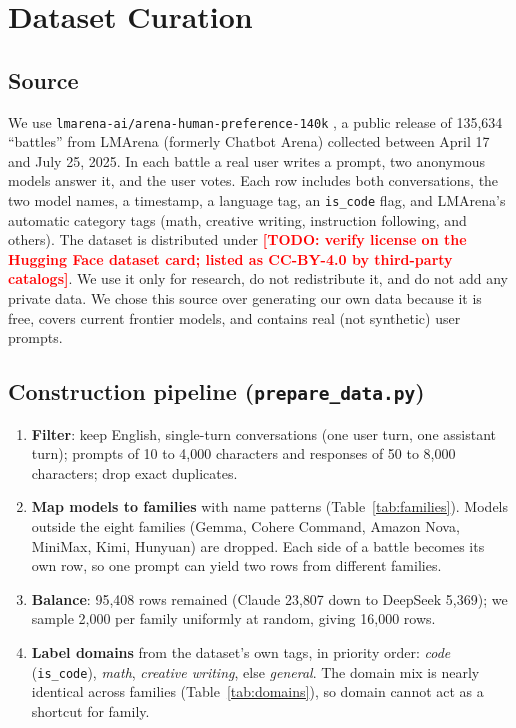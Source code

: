 \documentclass[11pt]{article}
\newcommand{\todo}[1]{\textcolor{red}{\textbf{[TODO: #1]}}}
\begin{document}
\section{Dataset Curation}
\subsection{Source}
We use \texttt{lmarena-ai/arena-human-preference-140k} \cite{chiang2024arena}, a public release of 135{,}634 ``battles'' from LMArena (formerly Chatbot Arena) collected between April 17 and July 25, 2025. In each battle a real user writes a prompt, two anonymous models answer it, and the user votes. Each row includes both conversations, the two model names, a timestamp, a language tag, an \texttt{is\_code} flag, and LMArena's automatic category tags (math, creative writing, instruction following, and others). The dataset is distributed under \todo{verify license on the Hugging Face dataset card; listed as CC-BY-4.0 by third-party catalogs}. We use it only for research, do not redistribute it, and do not add any private data. We chose this source over generating our own data because it is free, covers current frontier models, and contains real (not synthetic) user prompts.

\subsection{Construction pipeline (\texttt{prepare\_data.py})}
\begin{enumerate}
  \item \textbf{Filter}: keep English, single-turn conversations (one user turn, one assistant turn); prompts of 10 to 4{,}000 characters and responses of 50 to 8{,}000 characters; drop exact duplicates.
  \item \textbf{Map models to families} with name patterns (Table~\ref{tab:families}). Models outside the eight families (Gemma, Cohere Command, Amazon Nova, MiniMax, Kimi, Hunyuan) are dropped. Each side of a battle becomes its own row, so one prompt can yield two rows from different families.
  \item \textbf{Balance}: 95{,}408 rows remained (Claude 23{,}807 down to DeepSeek 5{,}369); we sample 2{,}000 per family uniformly at random, giving 16{,}000 rows.
  \item \textbf{Label domains} from the dataset's own tags, in priority order: \textit{code} (\texttt{is\_code}), \textit{math}, \textit{creative writing}, else \textit{general}. The domain mix is nearly identical across families (Table~\ref{tab:domains}), so domain cannot act as a shortcut for family.
\end{enumerate}
\end{document}
